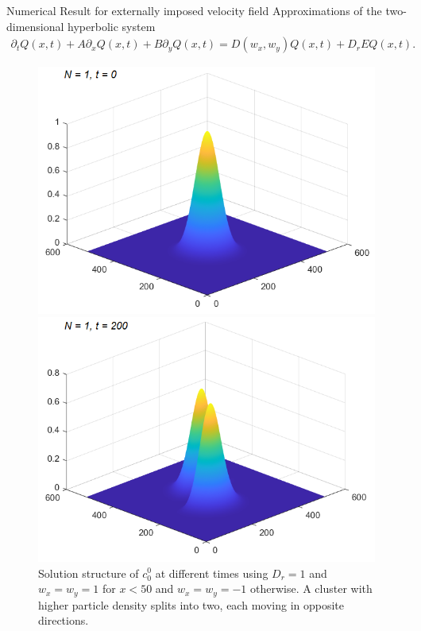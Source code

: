 \begin{frame}{Numerical Result for externally imposed velocity field}
	\scriptsize
	Approximations of the two-dimensional hyperbolic system
	\begin{align*}
			\partial_t Q(x,t) + A\partial_x Q(x,t) + B\partial_y Q(x,t) =  D(w_x,w_y)Q(x,t)+ D_rEQ(x,t).
	\end{align*}
	\begin{figure}[H]
	\centering
	 \begin{minipage}{0.4\textwidth}
	 \includegraphics[scale=0.3]{Bilder_wxwy/t=0_wxwy=1_wxwy=-1}
     \end{minipage}
     \hfill 
     \begin{minipage}{0.4\textwidth}
	   \includegraphics[scale=0.3]{Bilder_wxwy/t=200_wxwy=1_wxwy=-1}
     \end{minipage}
     \caption{Solution structure of $c^0_0$ at different times using $D_r=1$ and $w_x=w_y=1$ for $x<50$ and $w_x=w_y=-1$ otherwise. A cluster with higher particle density splits into two, each moving in opposite directions.}
    \end{figure}
\end{frame}



